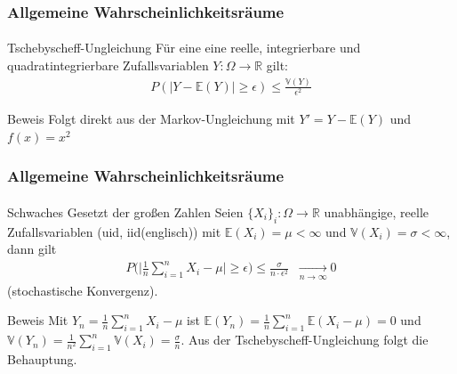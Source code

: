\documentclass{beamer}
\begin{document}
\begin{frame}
    \frametitle{Allgemeine Wahrscheinlichkeitsräume}
\framesubtitle{}

\begin{block}{Tschebyscheff-Ungleichung }
Für eine  eine  reelle, integrierbare und quadratintegrierbare  Zufallsvariablen $Y : \Omega \to \mathbb{R}$  gilt:
\begin{align*}
P (|Y  - \mathbb{E} (Y)|  \geq \epsilon) \leq \frac{\mathbb{V} (Y)}{ \epsilon^2} 
\end{align*}
\end{block}
\begin{block}{Beweis}
Folgt direkt aus der Markov-Ungleichung mit $Y' = Y -\mathbb{E}(Y)$ und $f(x) = x^2$
\end{block}
 \end{frame}



\begin{frame}
    \frametitle{Allgemeine Wahrscheinlichkeitsräume}
\framesubtitle{}

\begin{block}{Schwaches Gesetzt der großen Zahlen }
Seien $\{X_i  \}_i: \Omega \to \mathbb{R}$ unabhängige, reelle Zufallsvariablen (uid, iid(englisch)) mit $\mathbb{E}(X_i) = \mu < \infty$ und $\mathbb{V}(X_i) = \sigma < \infty$, dann gilt
\begin{align*}
P \bigl  ( \bigl | \frac{1}{n} \sum_{i=1}^{n} X_i - \mu \bigr |  \geq \epsilon \bigr) \leq \frac{\sigma}{ n \cdot \epsilon^2} \; \; \underset{n \to \infty}{\longrightarrow} 0
\end{align*}
(stochastische Konvergenz). 
\end{block}
\begin{block}{Beweis}
Mit $Y_n =  \frac{1}{n} \sum_{i=1}^{n}  X_i - \mu$ ist $\mathbb{E}(Y_n) =  \frac{1}{n} \sum_{i=1}^{n} \mathbb{E}( X_i - \mu) = 0$ und 
$\mathbb{V}(Y_n) =  \frac{1}{n^2} \sum_{i=1}^{n} \mathbb{V}( X_i ) = \frac{\sigma}{n}$. Aus der Tschebyscheff-Ungleichung folgt die Behauptung.
\end{block}
 \end{frame}
\end{document}
